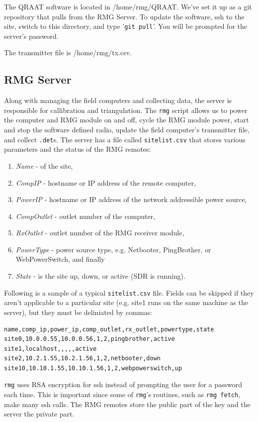 \documentclass[letter]{article}
\begin{document}
The QRAAT software is located in /home/rmg/QRAAT. We've set it up as a git 
repository that pulls from the RMG Server. To update the software, ssh to the site, 
switch to this directory, and type '\texttt{git pull}'. You will be prompted for 
the server's password.  

The transmitter file is /home/rmg/tx.csv. 

\subsection{RMG Server}
Along with managing the field computers and collecting data, the server is responsible for
callibration and triangulation. The \texttt{rmg} script allows us to power the computer and 
RMG module on and off, cycle the RMG module power, start and stop the software defined radio, 
update the field computer's transmitter file, and collect \texttt{.det}s. The server has a 
file called \texttt{sitelist.csv} that stores various parameters and the status of the RMG remotes:
\begin{enumerate}
  \item \textit{Name} - of the site, 
  \item \textit{CompIP} - hostname or IP address of the remote computer, 
  \item \textit{PowerIP} - hostname or IP address of the network addressible power source,
  \item \textit{CompOutlet} - outlet number of the computer, 
  \item \textit{RxOutlet} - outlet number of the RMG receiver module, 
  \item \textit{PowerType} - power source type, e.g. Netbooter, PingBrother, or WebPowerSwitch, and finally
  \item \textit{State} - is the site up, down, or active (SDR is running). 
\end{enumerate}
Following is a sample of a typical \texttt{sitelist.csv} file. Fields can be skipped if they aren't applicable
to a particular site (e.g. site1 runs on the same machine as the server), but they must be deliniated by 
commas:
\begin{verbatim}
name,comp_ip,power_ip,comp_outlet,rx_outlet,powertype,state
site0,10.0.0.55,10.0.0.56,1,2,pingbrother,active
site1,localhost,,,,,active
site2,10.2.1.55,10.2.1.56,1,2,netbooter,down
site10,10.10.1.55,10.10.1.56,1,2,webpowerswitch,up
\end{verbatim}

\texttt{rmg} uses RSA encryption for ssh instead of prompting the user for a password each time. This is 
important since some of \texttt{rmg}'s routines, such as \texttt{rmg fetch}, make many ssh calls. The 
RMG remotes store the public part of the key and the server the private part. 
\end{document}
